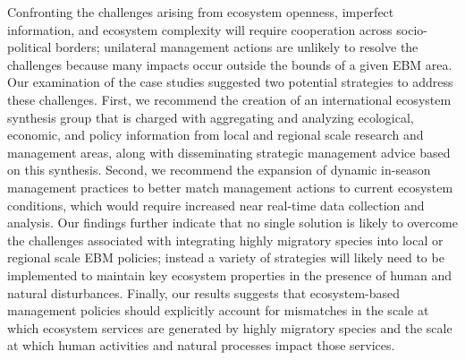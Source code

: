 Confronting the challenges arising from ecosystem openness, imperfect
information, and ecosystem complexity will require cooperation across
socio-political borders; unilateral management actions are unlikely to resolve
the challenges because many impacts occur outside the bounds of a given EBM
area. Our examination of the case studies suggested two potential strategies to
address these challenges. First, we recommend the creation of an international
ecosystem synthesis group that is charged with aggregating and analyzing
ecological, economic, and policy information from local and regional scale
research and management areas, along with disseminating strategic management
advice based on this synthesis. Second, we recommend the expansion of dynamic
in-season management practices to better match management actions to current
ecosystem conditions, which would require increased near real-time data
collection and analysis. Our findings further indicate that no single solution
is likely to overcome the challenges associated with integrating highly
migratory species into local or regional scale EBM policies; instead a
variety of strategies will likely need to be implemented to maintain key
ecosystem properties in the presence of human and natural disturbances. Finally,
our results suggests that ecosystem-based management policies should explicitly
account for mismatches in the scale at which ecosystem services are generated by
highly migratory species and the scale at which human activities and natural
processes impact those services.

